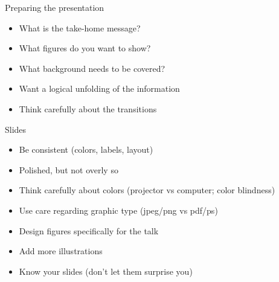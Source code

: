 \documentclass[12pt]{article}
\newcommand{\headsize}{\fontsize{35}{35} \selectfont}
\newcommand{\smallsize}{\fontsize{25}{30} \selectfont}
\newcommand{\smallersize}{\fontsize{20}{25} \selectfont}
\begin{document}
\newpage

\headsize \color{myyellow}
\hfill \begin{minipage}{5.75in}
\centering
Preparing the presentation
\end{minipage}

\vspace{3cm} \color{mywhite} \smallsize

\hfill \begin{minipage}{9.5in}

\begin{itemize}
\itemsep24pt
\item What is the take-home message?

\item What figures do you want to show?

\item What background needs to be covered?

\item Want a logical unfolding of the information

\item Think carefully about the transitions

\end{itemize}

\end{minipage}







\newpage

\headsize \color{myyellow}
\hfill \begin{minipage}{5.75in}
\centering
Slides
\end{minipage}

\vspace{30mm} \color{mywhite} \smallsize

\hfill \begin{minipage}{9.5in}

\begin{itemize}
\itemsep24pt
\item Be consistent {\color{myblue} \smallersize (colors, labels, layout)}

\item Polished, but not overly so

\item Think carefully about colors {\color{myblue} \smallersize
    (projector vs computer; color blindness)}

\item Use care regarding graphic type {\color{myblue} \smallersize
    (jpeg/png vs pdf/ps)}

\item Design figures specifically for the talk

\item Add more illustrations

\item Know your slides {\color{myblue} \smallersize (don't let them
    surprise you)}

\end{itemize}

\end{minipage}
\end{document}
